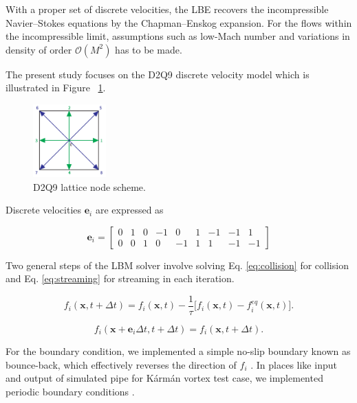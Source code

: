With a proper set of discrete velocities, the LBE recovers the incompressible Navier–Stokes equations by the Chapman–Enskog expansion. For the flows within the incompressible limit, assumptions such as low-Mach number and variations in density of order $\mathcal{O}(M^2)$ has to be made.

The present study focuses on the D2Q9 discrete velocity model which is illustrated in Figure~ \ref{fig:d2q9-node}. 

\begin{figure}[!ht]
	\centering
	\captionsetup{justification=centering}
	\includegraphics[width=0.25\textwidth]{figures/D2Q9_colored.pdf}
	\caption{D2Q9 lattice node scheme.}
	\label{fig:d2q9-node}
\end{figure}

Discrete velocities $\bm{e}_i$ are expressed as

\begin{equation}
	\label{discrete-velocities}
	\bm{e}_i = \begin{bmatrix}
		0 & 1 & 0 &-1 & 0 & 1 &-1 &-1 & 1\\
		0 & 0 & 1 & 0 &-1 & 1 & 1 &-1 &-1
	\end{bmatrix}
\end{equation}

Two general steps of the LBM solver involve solving  Eq. \ref{eq:collision} for collision and Eq. \ref{eq:streaming} for streaming in each iteration.

\begin{equation}
	\label{eq:collision}
	f_i (\bm{x},t+\Delta t) = f_i (\bm{x},t)-\frac{1}{\tau}\Big[f_i (\bm{x},t) - f_i^{eq} (\bm{x},t)\Big].
\end{equation}

\begin{equation}
	\label{eq:streaming}
	f_i (\bm{x}+\bm{e}_i\Delta t,t+\Delta t) = f_i (\bm{x},t+\Delta t).
\end{equation}

For the boundary condition, we implemented a simple no-slip boundary known as bounce-back, which effectively reverses the direction of $f_i$ \cite{Mawson2014InteractiveFI}. In places like input and output of simulated pipe for Kármán vortex test case, we implemented periodic boundary conditions \cite{succi2018lattice}.

